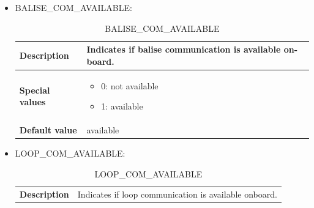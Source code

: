 	\begin{itemize}
		\item BALISE\_COM\_AVAILABLE:

			\begin{longtable}{|l|l|}
				\caption{BALISE\_COM\_AVAILABLE}\\
				\hline

					\begin{minipage}[t]{0.22\linewidth} \textbf{Description}	\end{minipage}
				&	\begin{minipage}[t]{0.78\linewidth} Indicates if balise communication is available on-board. \end{minipage} \\

				\hline

					\begin{minipage}[t]{0.22\linewidth} \textbf{Special values}	\end{minipage}
				&	\begin{minipage}[t]{0.78\linewidth} \begin{itemize} \item 0: not available \item 1: available \end{itemize} \end{minipage} \\

				\hline

					\begin{minipage}[t]{0.22\linewidth} \textbf{Default value}	\end{minipage}
				&	\begin{minipage}[t]{0.78\linewidth} available \end{minipage} \\

				\hline

			\end{longtable}

		\item LOOP\_COM\_AVAILABLE:

			\begin{longtable}{|l|l|}
				\caption{LOOP\_COM\_AVAILABLE}\\
				\hline

					\begin{minipage}[t]{0.22\linewidth} \textbf{Description}	\end{minipage}
				&	\begin{minipage}[t]{0.78\linewidth} Indicates if loop communication is available onboard. \end{minipage} \\


\end{longtable}
\end{itemize}
